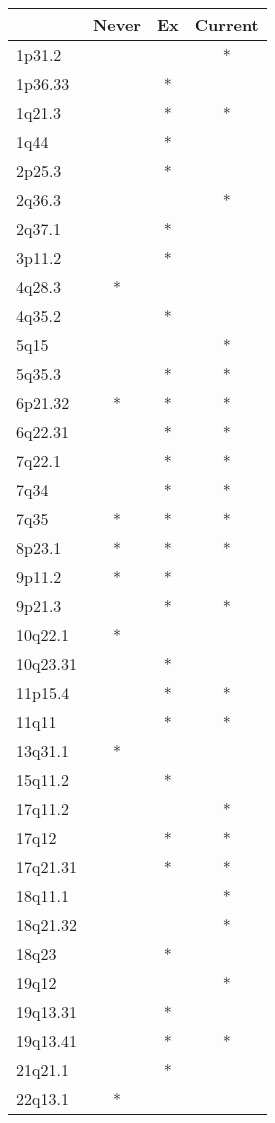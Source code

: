 \begin{tabular}{lccc}
\toprule
{} & Never & Ex & Current \\
\midrule
1p31.2   &       &    &       * \\
1p36.33  &       &  * &         \\
1q21.3   &       &  * &       * \\
1q44     &       &  * &         \\
2p25.3   &       &  * &         \\
2q36.3   &       &    &       * \\
2q37.1   &       &  * &         \\
3p11.2   &       &  * &         \\
4q28.3   &     * &    &         \\
4q35.2   &       &  * &         \\
5q15     &       &    &       * \\
5q35.3   &       &  * &       * \\
6p21.32  &     * &  * &       * \\
6q22.31  &       &  * &       * \\
7q22.1   &       &  * &       * \\
7q34     &       &  * &       * \\
7q35     &     * &  * &       * \\
8p23.1   &     * &  * &       * \\
9p11.2   &     * &  * &         \\
9p21.3   &       &  * &       * \\
10q22.1  &     * &    &         \\
10q23.31 &       &  * &         \\
11p15.4  &       &  * &       * \\
11q11    &       &  * &       * \\
13q31.1  &     * &    &         \\
15q11.2  &       &  * &         \\
17q11.2  &       &    &       * \\
17q12    &       &  * &       * \\
17q21.31 &       &  * &       * \\
18q11.1  &       &    &       * \\
18q21.32 &       &    &       * \\
18q23    &       &  * &         \\
19q12    &       &    &       * \\
19q13.31 &       &  * &         \\
19q13.41 &       &  * &       * \\
21q21.1  &       &  * &         \\
22q13.1  &     * &    &         \\
\bottomrule
\end{tabular}
